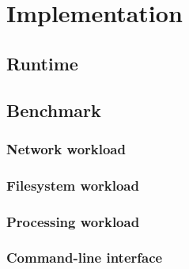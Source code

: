 \chapter{Implementation}
\label{ch:implementation}
\section{Runtime}

\section{Benchmark}
\subsection{Network workload}
\subsection{Filesystem workload}
\subsection{Processing workload}
\subsection{Command-line interface}
